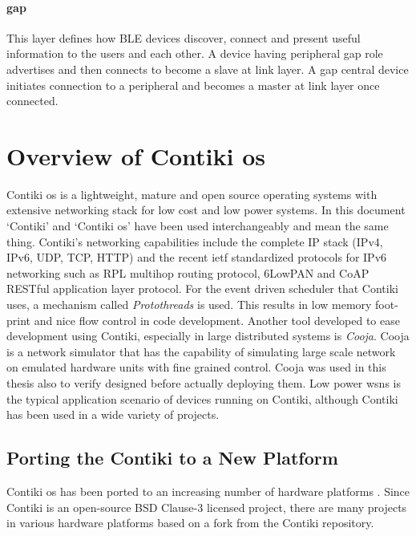 \paragraph{\gls{gap}}
This layer defines how BLE devices discover, connect and present useful information to the users and each other. A device having peripheral \gls{gap} role advertises and then connects to become a slave at link layer. A \gls{gap} central device initiates connection to a peripheral and becomes a master at link layer once connected.

\section[Overview of Contiki \texorpdfstring{\gls{os}}{OS}]{Overview of Contiki \texorpdfstring{\gls{os}}{OS}} \label{OverviewContiki}

Contiki \gls{os} is a lightweight, mature and open source operating systems with extensive networking stack for low cost and low power systems\cite{Contiki}. In this document `Contiki' and `Contiki \gls{os}' have been used interchangeably and mean the same thing. Contiki's networking capabilities include the complete IP stack (IPv4, IPv6, UDP, TCP, HTTP) and the recent \gls{ietf} standardized protocols for IPv6 networking such as RPL multihop routing protocol, 6LowPAN and CoAP RESTful application layer protocol. For the event driven scheduler that Contiki uses, a mechanism called \emph{Protothreads} is used. This results in low memory foot-print and nice flow control in code development. Another tool developed to ease development using Contiki, especially in large distributed systems is \emph{Cooja}. Cooja is a network simulator that has the capability of simulating large scale network on emulated hardware units with fine grained control. Cooja was used in this thesis also to verify designed before actually deploying them. Low power \glspl{wsn} is the typical application scenario of devices running on Contiki, although Contiki has been used in a wide variety of projects.



\subsection{Porting the Contiki to a New Platform} \label{2Porting}
Contiki \gls{os} has been ported to an increasing number of hardware platforms \cite{contikiHw}. Since Contiki is an open-source BSD Clause-3 licensed project, there are many projects in various hardware platforms based on a fork from the Contiki repository.


